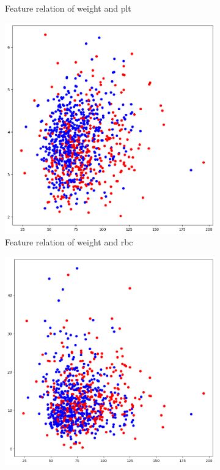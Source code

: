 \documentclass[../main.tex]{subfiles}
\begin{document}
\begin{figure}[H]
\begin{subfigure}{0.45\textwidth}
        \caption{Feature relation of weight and plt}
        \label{fig:tabpfn-weight-plt}
    \end{subfigure}

    \vfill

    \begin{subfigure}{0.45\textwidth}
        \centering
        \includegraphics[width=\linewidth]{Figure/tabpfn-weight-rbc.png}
        \caption{Feature relation of weight and rbc}
        \label{fig:tabpfn-weight-rbc}
    \end{subfigure}
    \hfill
    \begin{subfigure}{0.45\textwidth}
        \centering
        \includegraphics[width=\linewidth]{Figure/tabpfn-weight-wbc.png}

\end{subfigure}
\end{figure}
\end{document}
